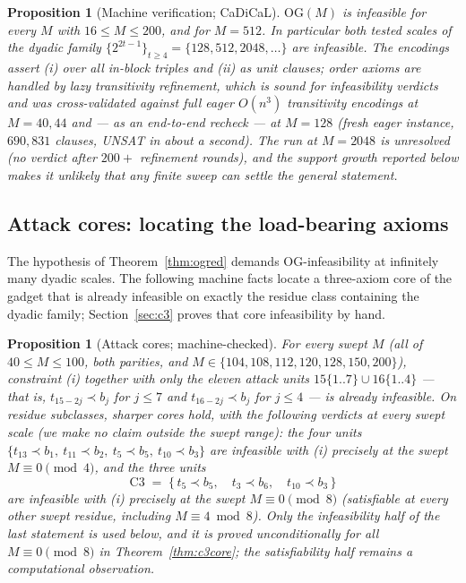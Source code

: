 \documentclass[11pt]{article}
\newtheorem{proposition}[theorem]{Proposition}
\theoremstyle{definition}
\newcommand{\OG}{\mathrm{OG}}
\begin{document}
\begin{proposition}[Machine verification; CaDiCaL]\label{prop:ogmachine}
$\OG(M)$ is infeasible for every $M$ with $16 \le M \le 200$, and
for $M = 512$. In particular both tested scales of the dyadic family
$\{2^{2t-1}\}_{t \ge 4} = \{128, 512, 2048, \dots\}$ are infeasible.
The encodings assert (i) over all in-block triples and (ii) as unit
clauses; order axioms are handled by lazy transitivity refinement,
which is sound for infeasibility verdicts and was cross-validated
against full eager $O(n^3)$ transitivity encodings at $M = 40, 44$ and
--- as an end-to-end recheck --- at $M = 128$ (fresh eager instance,
$690{,}831$ clauses, UNSAT in about a second). The run at $M = 2048$
is unresolved (no verdict after $200+$ refinement rounds), and the
support growth reported below makes it unlikely that any finite sweep
can settle the general statement.
\end{proposition}

\subsection{Attack cores: locating the load-bearing axioms}

The hypothesis of Theorem~\ref{thm:ogred} demands $\OG$-infeasibility at
infinitely many dyadic scales. The following machine facts locate a
three-axiom core of the gadget that is already infeasible on exactly the
residue class containing the dyadic family; Section~\ref{sec:c3} proves
that core infeasibility by hand.

\begin{proposition}[Attack cores; machine-checked]\label{prop:cores}
For every swept $M$ (all of $40 \le M \le 100$, both parities, and
$M \in \{104, 108, 112, 120, 128, 150, 200\}$), constraint (i)
together with only the eleven attack units
$15\{1..7\} \cup 16\{1..4\}$ --- that is, $t_{15-2j} \prec b_j$ for
$j \le 7$ and $t_{16-2j} \prec b_j$ for $j \le 4$ --- is already
infeasible. On residue subclasses, sharper cores hold, with the following
verdicts \emph{at every swept scale} (we make no claim outside the swept
range): the four units $\{t_{13} \prec b_1,\ t_{11} \prec b_2,\
t_5 \prec b_5,\ t_{10} \prec b_3\}$ are infeasible with (i) precisely at the
swept $M \equiv 0 \pmod 4$, and the three units
\[
\mathrm{C3} \;=\; \{\,t_5 \prec b_5,\quad t_3 \prec b_6,\quad
t_{10} \prec b_3\,\}
\]
are infeasible with (i) precisely at the swept $M \equiv 0 \pmod 8$
(satisfiable at every other swept residue, including
$M \equiv 4 \bmod 8$). Only the infeasibility half of the last statement is
used below, and it is proved unconditionally for all
$M \equiv 0 \pmod 8$ in Theorem~\ref{thm:c3core}; the satisfiability half
remains a computational observation.
\end{proposition}
\end{document}
